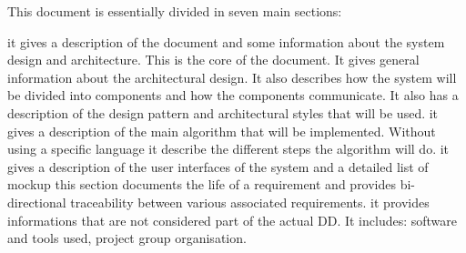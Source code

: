 This document is essentially divided in seven main sections:
\begin{itemize}
	 it gives a description of the  document and some information about the system design and architecture. 
	 This is the core of the document. It gives general information about the architectural design. It also describes how the system will be divided into components and how the components communicate. It also has a description of the design pattern and architectural styles that will be used.
	 it gives a description of the main algorithm that will be implemented. Without using a specific language it describe the different steps the algorithm will do.
	 it gives a description of the user interfaces of the system and a detailed list of mockup
	 this section documents the life of a requirement and provides bi-directional traceability between various associated requirements. 
	 it provides informations that are not considered part of the actual DD. It includes: software and tools used, project group organisation.	
\end{itemize}